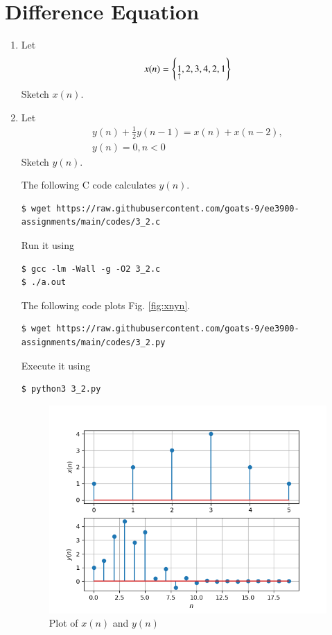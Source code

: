 \documentclass[journal,12pt,twocolumn]{IEEEtran}
\renewcommand\thesection{\arabic{section}}
\begin{document}
\section{Difference Equation}
\begin{enumerate}[label=\thesection.\arabic*,ref=\thesection.\theenumi]
\item Let
\begin{equation}
x(n) = \left\{\underset{\uparrow}{1},2,3,4,2,1\right\}
\end{equation}
Sketch $x(n)$.
\item Let
\begin{multline}
\label{eq:iir_filter}
y(n) + \frac{1}{2}y(n-1) = x(n) + x(n-2), 
\\
y(n) = 0, n < 0
\end{multline}
Sketch $y(n)$.

\solution The following C code calculates $y(n)$.
\begin{lstlisting}
$ wget https://raw.githubusercontent.com/goats-9/ee3900-assignments/main/codes/3_2.c
\end{lstlisting}
Run it using
\begin{lstlisting}
$ gcc -lm -Wall -g -O2 3_2.c
$ ./a.out
\end{lstlisting}
The following code plots Fig. \eqref{fig:xnyn}.
\begin{lstlisting}
$ wget https://raw.githubusercontent.com/goats-9/ee3900-assignments/main/codes/3_2.py
\end{lstlisting}
Execute it using
\begin{lstlisting}
$ python3 3_2.py
\end{lstlisting}

\begin{figure}[!ht]
	\centering
	\includegraphics[width=\columnwidth]{figs/3_2.png}
	\caption{Plot of $x(n)$ and $y(n)$}
	\label{fig:xnyn}
\end{figure}
\end{enumerate}
\end{document}
